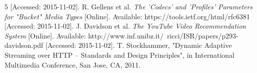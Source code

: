 \begin{thebibliography}{5}
        [Accessed: 2015-11-02].
        R. Gellens et al.
        \textit{The 'Codecs' and 'Profiles' Parameters for "Bucket" Media Types}
        [Online].
        Available:
        https://tools.ietf.org/html/rfc6381
        [Accessed: 2015-11-02].
        J. Davidson et al.
        \textit{The YouTube Video Recommendation System}
        [Online].
        Available:
        http://www.inf.unibz.it/~ricci/ISR/papers/p293-davidson.pdf
        [Accessed: 2015-11-02].
        T. Stockhammer,
        "Dynamic Adaptive Streaming over HTTP – Standards and Design Principles",
        in International Multimedia Conference,
        San Jose, CA,
        2011.
\end{thebibliography}
